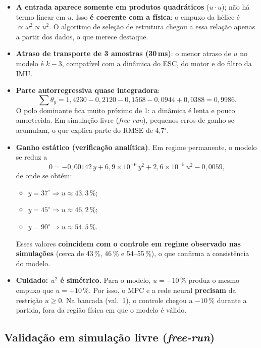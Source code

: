 \documentclass[12pt,a4paper]{article}
\newcommand{\graus}{$^\circ$}
\newcommand{\atencao}[1]{\textcolor{red!70!black}{\textbf{#1}}}
\begin{document}
\begin{itemize}
    \item \textbf{A entrada aparece somente em produtos quadráticos} ($u\cdot u$); não há termo linear em $u$. Isso \textbf{é coerente com a física}: o empuxo da hélice é $\propto \omega^2 \propto u^2$. O algoritmo de seleção de estrutura chegou a essa relação apenas a partir dos dados, o que merece destaque.
    \item \textbf{Atraso de transporte de 3 amostras (30\,ms)}: o menor atraso de $u$ no modelo é $k-3$, compatível com a dinâmica do ESC, do motor e do filtro da IMU.
    \item \textbf{Parte autorregressiva quase integradora}:
    \begin{equation}
        \sum \theta_y = 1{,}4230 - 0{,}2120 - 0{,}1568 - 0{,}0944 + 0{,}0388 = 0{,}9986 .
    \end{equation}
    O polo dominante fica muito próximo de 1: a dinâmica é lenta e pouco amortecida. Em simulação livre (\textit{free-run}), pequenos erros de ganho se acumulam, o que explica parte do RMSE de 4,7\graus{}.
    \item \textbf{Ganho estático (verificação analítica)}. Em regime permanente, o modelo se reduz a
    \begin{equation}
        0 = -0{,}00142\,y + 6{,}9\times10^{-6}\,y^2 + 2{,}6\times10^{-5}\,u^2 - 0{,}0059 ,
    \end{equation}
    de onde se obtém:
    \begin{itemize}
        \item $y = 37^\circ \Rightarrow u \approx 43{,}3\,\%$;
        \item $y = 45^\circ \Rightarrow u \approx 46{,}2\,\%$;
        \item $y = 90^\circ \Rightarrow u \approx 54{,}5\,\%$.
    \end{itemize}
    Esses valores \textbf{coincidem com o controle em regime observado nas simulações} (cerca de 43\,\%, 46\,\% e 54--55\,\%), o que confirma a consistência do modelo.
    \item \atencao{Cuidado: $u^2$ é simétrico.} Para o modelo, $u=-10\,\%$ produz o mesmo empuxo que $u=+10\,\%$. Por isso, o MPC e a rede neural \textbf{precisam} da restrição $u \geq 0$. Na bancada (val.~1), o controle chegou a $-10\,\%$ durante a partida, fora da região física em que o modelo é válido.
\end{itemize}

\subsection{Validação em simulação livre (\textit{free-run})}
\end{document}
